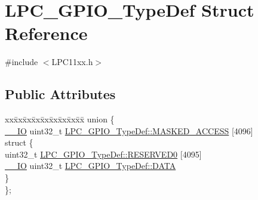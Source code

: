 \hypertarget{struct_l_p_c___g_p_i_o___type_def}{}\section{L\+P\+C\+\_\+\+G\+P\+I\+O\+\_\+\+Type\+Def Struct Reference}
\label{struct_l_p_c___g_p_i_o___type_def}


{\ttfamily \#include $<$L\+P\+C11xx.\+h$>$}

\subsection*{Public Attributes}
\begin{DoxyCompactItemize}
\item 
\begin{tabbing}
xx\=xx\=xx\=xx\=xx\=xx\=xx\=xx\=xx\=\kill
union \{\\
\>\hyperlink{group___c_m_s_i_s__core__definitions_gaec43007d9998a0a0e01faede4133d6be}{\_\_IO} uint32\_t \hyperlink{group___l_p_c11xx___definitions_ga42131a82621eb8fd5f55365654dabdba}{LPC\_GPIO\_TypeDef::MASKED\_ACCESS} \mbox{[}4096\mbox{]}\\
\>struct \{\\
\>\>uint32\_t \hyperlink{group___l_p_c11xx___definitions_gaea82533d430cb89b9623ac026edc2517}{LPC\_GPIO\_TypeDef::RESERVED0} \mbox{[}4095\mbox{]}\\
\>\>\hyperlink{group___c_m_s_i_s__core__definitions_gaec43007d9998a0a0e01faede4133d6be}{\_\_IO} uint32\_t \hyperlink{group___l_p_c11xx___definitions_gaef9bb9639cb3af843526756c06ff763e}{LPC\_GPIO\_TypeDef::DATA}\\
\>\} \\
\}; \\


\end{tabbing}
\end{DoxyCompactItemize}
